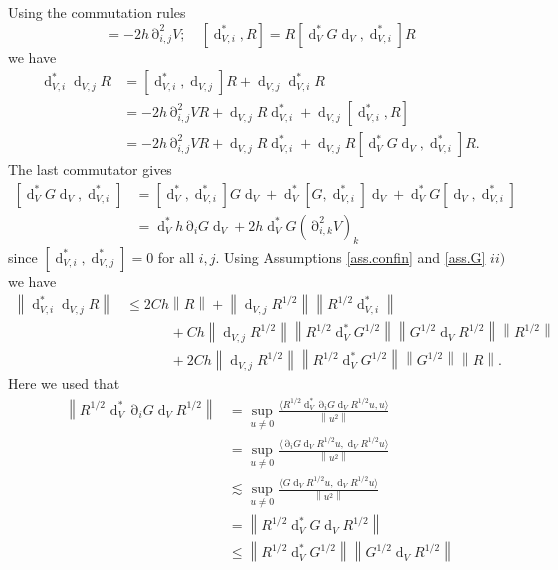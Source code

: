 \documentclass[12pt]{amsart}
\def\<{\langle}
\def\>{\rangle}
\renewcommand{\d}{\operatorname{d}}
\numberwithin{equation}{section}
\numberwithin{figure}{section}
\DeclareMathOperator{\p}{\partial}
\newcommand{\vvert}[1]{\left\lVert#1\right\rVert}
\begin{document}
Using the commutation rules
\begin{equation*}
[\d_{V,i}^*,\d_{V,j}] = -2h\p_{i,j}^2V;\quad [\d_{V,i}^*,R] = R[\d_V^*G\d_V,\d_{V,i}^*]R
\end{equation*}
we have
\begin{equation*}
\begin{split}
    \d_{V,i}^*\d_{V,j}R &= [\d_{V,i}^*,\d_{V,j}]R + \d_{V,j}\d_{V,i}^*R\\
    &= -2h\p_{i,j}^2VR + \d_{V,j}R\d_{V,i}^* + \d_{V,j}[\d_{V,i}^*,R]\\
    &= -2h\p_{i,j}^2VR + \d_{V,j}R\d_{V,i}^* + \d_{V,j}R[\d_V^*G\d_V,\d_{V,i}^*]R.
\end{split}
\end{equation*}
The last commutator gives
\begin{equation*}
\begin{split}
    [\d_V^*G\d_V,\d_{V,i}^*] &= [\d_V^*,\d_{V,i}^*]G\d_V + \d_V^*[G,\d_{V,i}^*]\d_V + \d_V^*G[\d_V,\d_{V,i}^*]\\
    &= \d_V^*h\p_iG\d_V + 2h\d_V^*G(\p_{i,k}^2V)_{k}
\end{split}
\end{equation*}
since $[\d_{V,i}^*,\d_{V,j}^*] = 0$ for all $i,j$. Using Assumptions \ref{ass.confin} and \ref{ass.G} $ii)$ we have
\begin{equation*}
\begin{split}
    \vvert{\d_{V,i}^*\d_{V,j}R} &\leq 2Ch\vvert{R} + \vvert{\d_{V,j}R^{1/2}}\vvert{R^{1/2}\d_{V,i}^*}\\
    &\phantom{*****} + Ch\vvert{\d_{V,j}R^{1/2}}\vvert{R^{1/2}\d_V^*G^{1/2}}\vvert{G^{1/2}\d_VR^{1/2}}\vvert{R^{1/2}}\\
    &\phantom{*****} + 2Ch\vvert{\d_{V,j}R^{1/2}}\vvert{R^{1/2}\d_V^*G^{1/2}}\vvert{G^{1/2}}\vvert{R}.
\end{split}
\end{equation*}
Here we used that
\begin{equation*}
\begin{split}
    \vvert{R^{1/2}\d_V^*\p_iG\d_VR^{1/2}} &= \sup_{u\neq0}\frac{\<R^{1/2}\d_V^*\p_iG\d_VR^{1/2}u,u\>}{\vvert{u^2}}\\
    &= \sup_{u\neq0}\frac{\<\p_iG\d_VR^{1/2}u,\d_VR^{1/2}u\>}{\vvert{u^2}}\\
    &\lesssim \sup_{u\neq0}\frac{\<G\d_VR^{1/2}u,\d_VR^{1/2}u\>}{\vvert{u^2}}\\
    &= \vvert{R^{1/2}\d_V^*G\d_VR^{1/2}}\\
    &\leq \vvert{R^{1/2}\d_V^*G^{1/2}}\vvert{G^{1/2}\d_VR^{1/2}}
\end{split}
\end{equation*}
\end{document}
